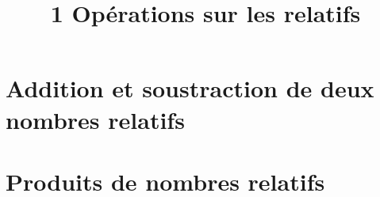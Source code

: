 \documentclass[12pt,a4paper]{article}
\date{}
\title{\textcircled{{\normalsize{1}}} Opérations sur les relatifs}
\begin{document}
	
	\maketitle



%
%
%
%
%
%
 
\section{Addition et soustraction de deux nombres relatifs}



\newpage

%
%

\section{Produits de nombres relatifs}


\end{document}
